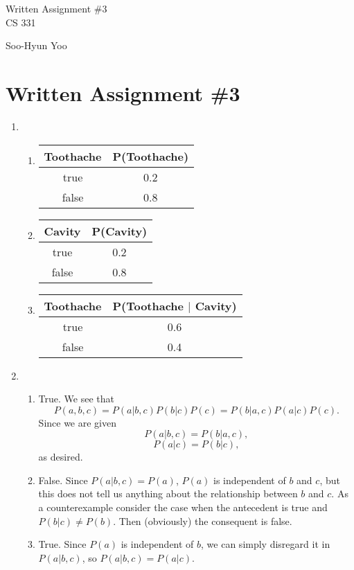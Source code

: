 \documentclass[10pt,letterpaper]{article}
\begin{document}
\begin{titlepage}
	\vspace*{4cm}
	\begin{flushright}
	{\huge
		Written Assignment \#3 \\ [3cm]
	}
	{\large
		CS 331
	}
	\end{flushright}

	\begin{flushright}
	Soo-Hyun Yoo
	\end{flushright}
\end{titlepage}

\section*{Written Assignment \#3}

\begin{enumerate}
	\item
		\begin{enumerate}
			\item
				\begin{tabular}{|c|c|} \hline
					{\bf Toothache} & {\bf P(Toothache)} \\ \hline
					true & 0.2 \\ \hline
					false & 0.8 \\ \hline
				\end{tabular}
			\item
				\begin{tabular}{|c|c|} \hline
					{\bf Cavity} & {\bf P(Cavity)} \\ \hline
					true & 0.2 \\ \hline
					false & 0.8 \\ \hline
				\end{tabular}
			\item
				\begin{tabular}{|c|c|} \hline
					{\bf Toothache} & {\bf P(Toothache $|$ Cavity)} \\ \hline
					true & 0.6 \\ \hline
					false & 0.4 \\ \hline
				\end{tabular}
		\end{enumerate}

	\item
		\begin{enumerate}
			\item True. We see that \[P(a,b,c) = P(a|b,c)P(b|c)P(c)
				= P(b|a,c)P(a|c)P(c).\] Since we are given \[P(a|b,c)
				= P(b|a,c),\] \[P(a|c) = P(b|c),\] as desired.
			\item False. Since $P(a|b,c)=P(a)$, $P(a)$ is independent of $b$
				and $c$, but this does not tell us anything about the
				relationship between $b$ and $c$. As a counterexample consider
				the case when the antecedent is true and $P(b|c) \neq P(b)$.
				Then (obviously) the consequent is false.
			\item True. Since $P(a)$ is independent of $b$, we can simply
				disregard it in $P(a|b,c)$, so $P(a|b,c)=P(a|c)$.
		\end{enumerate}


\end{enumerate}
\end{document}
